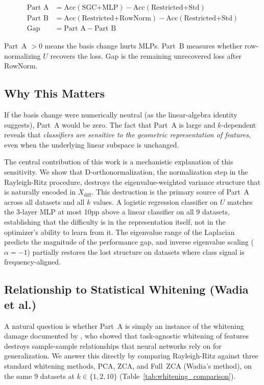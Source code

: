 \documentclass[11pt]{article}
\begin{document}
\begin{align}
\text{Part A} &= \text{Acc}(\text{SGC+MLP}) - \text{Acc}(\text{Restricted+Std})
  \label{eq:part_a}\\
\text{Part B} &= \text{Acc}(\text{Restricted+RowNorm}) - \text{Acc}(\text{Restricted+Std})
  \label{eq:part_b}\\
\text{Gap}    &= \text{Part A} - \text{Part B}
  \label{eq:gap}
\end{align}

Part~A $> 0$ means the basis change hurts MLPs.
Part~B measures whether row-normalizing $U$ recovers the loss.
Gap is the remaining unrecovered loss after RowNorm.

\subsection{Why This Matters}

If the basis change were numerically neutral (as the linear-algebra identity suggests),
Part~A would be zero.  The fact that Part~A is large and $k$-dependent reveals that
\emph{classifiers are sensitive to the geometric representation of features}, even when
the underlying linear subspace is unchanged.

The central contribution of this work is a mechanistic explanation of this sensitivity.
We show that D-orthonormalization, the normalization step in the Rayleigh-Ritz
procedure, destroys the eigenvalue-weighted variance structure that is naturally
encoded in $X_{\mathrm{diff}}$.  This destruction is the primary source of Part~A
across all datasets and all $k$ values.  A logistic regression classifier on $U$
matches the 3-layer MLP at most 10pp above a linear classifier on all 9 datasets, establishing that the
difficulty is in the representation itself, not in the optimizer's ability to learn
from it.  The eigenvalue range of the Laplacian predicts the magnitude of the
performance gap, and inverse eigenvalue scaling ($\alpha{=}-1$) partially restores
the lost structure on datasets where class signal is frequency-aligned.

\subsection{Relationship to Statistical Whitening (Wadia et al.)}
\label{sec:wadia}

A natural question is whether Part~A is simply an instance of the whitening damage
documented by \citet{wadia2021whitening}, who showed that task-agnostic whitening
of features destroys sample-sample relationships that neural networks rely on for
generalization.  We answer this directly by comparing Rayleigh-Ritz against three
standard whitening methods, PCA, ZCA, and Full~ZCA (Wadia's method), on the
same 9 datasets at $k \in \{1, 2, 10\}$ (Table~\ref{tab:whitening_comparison}).
\end{document}
